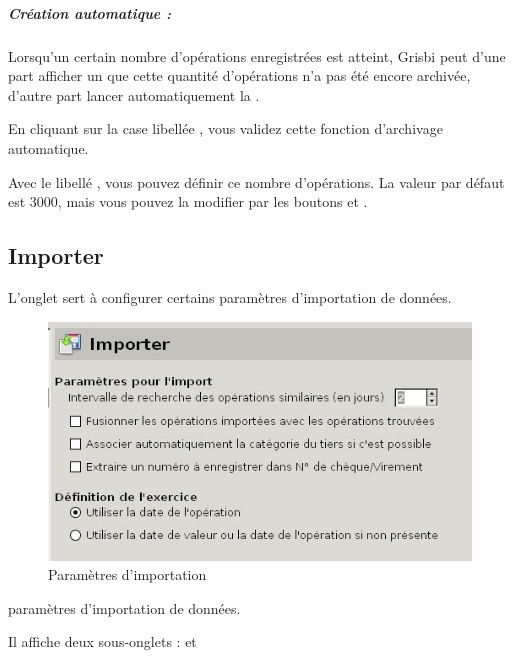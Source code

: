 \subparagraph{Création automatique :\label{setup-general-archives-create}}

Lorsqu'un certain nombre d'opérations enregistrées est atteint, Grisbi peut d'une part afficher un   que cette quantité d'opérations n'a pas été encore archivée, d'autre part lancer automatiquement la .

En cliquant sur la case libellée , vous validez cette fonction d'archivage automatique.

Avec le libellé , vous pouvez définir ce nombre d'opérations. La valeur par défaut est 3000, mais vous pouvez la modifier par les boutons \menu{+} et \menu{-}.


\subsection{Importer\label{setup-general-import}}

L'onglet  sert à configurer certains \ifIllustration paramètres d'importation de données.
\begin{figure}[htbp]
\begin{center}
\includegraphics[scale=0.5]{image/screenshot/setup_import}
\end{center}
\caption{Paramètres d'importation}
\label{setup-import-img}
\end{figure}
\else paramètres d'importation de données.
\fi

Il affiche deux sous-onglets :  et 

